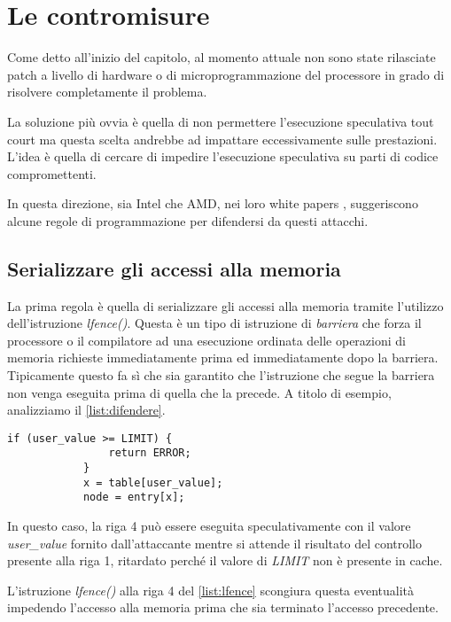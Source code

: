 	\section{Le contromisure}
		Come detto all'inizio del capitolo, al momento attuale non sono state rilasciate patch a livello di hardware o di microprogrammazione del processore in grado di risolvere completamente il problema.
		
		La soluzione più ovvia è quella di non permettere l'esecuzione speculativa tout court ma questa scelta andrebbe ad impattare eccessivamente sulle prestazioni. L'idea è quella di cercare di impedire l'esecuzione speculativa su parti di codice compromettenti.
		
		In questa direzione, sia Intel che AMD, nei loro white papers \cite{AMD2018speculation,intel2018speculative}, suggeriscono alcune regole di programmazione per difendersi da questi attacchi.
		
		\subsection*{Serializzare gli accessi alla memoria}
		
		La prima regola è quella di serializzare gli accessi alla memoria tramite l'utilizzo dell'istruzione \emph{lfence()}. Questa è un tipo di istruzione di \emph{barriera} che forza il processore o il compilatore ad una esecuzione ordinata delle operazioni di memoria richieste immediatamente prima ed immediatamente dopo la barriera. Tipicamente questo fa sì che sia garantito che l'istruzione che segue la barriera non venga eseguita prima di quella che la precede. A titolo di esempio, analizziamo il \cref{list:difendere}.
		
		\begin{lstlisting}[caption={Codice da difendere},label={list:difendere}]
			if (user_value >= LIMIT) {
				return ERROR;
			} 
			x = table[user_value]; 
			node = entry[x];
		\end{lstlisting}
		
		In questo caso, la riga 4 può essere eseguita speculativamente con il valore \emph{user\_value} fornito dall'attaccante mentre si attende il risultato del controllo presente alla riga 1, ritardato perché il valore di \emph{LIMIT} non è presente in cache. 
		
		L'istruzione \emph{lfence()} alla riga 4 del \cref{list:lfence} scongiura questa eventualità impedendo l'accesso alla memoria prima che sia terminato l'accesso precedente.
		
